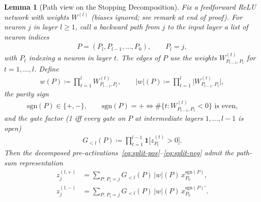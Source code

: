 \documentclass[twoside]{article}
\newcommand{\1}{\mathbf{1}}
\newtheorem{lemma}{Lemma}
\begin{document}
\begin{lemma}[Path view on the Stopping Decomposition]\label{lem:parity-path}
Fix a feedforward ReLU network with weights $W^{(l)}$ (biases ignored; see remark at end of proof).
For neuron $j$ in layer $l \ge 1$, call a \emph{backward path} from $j$ to the input layer a list
of neuron indices
\begin{align}
    P = (P_l, P_{l-1}, \dots, P_0), \qquad P_l = j,
\end{align}
with $P_t$ indexing a neuron in layer $t$. The edges of $P$ use the weights $W^{(t)}_{P_{t-1},
    P_t}$ for $t = 1, \dots, l$. Define
\begin{align}
    w(P) \coloneqq \prod_{t=1}^{l} W^{(t)}_{P_{t-1}, P_t},
    \qquad
    |w|(P) \coloneqq \prod_{t=1}^{l} \bigl| W^{(t)}_{P_{t-1}, P_t} \bigr|,
\end{align}
the parity sign
\begin{align}
    \mathrm{sgn}(P) \in \{+,-\},
    \qquad
    \mathrm{sgn}(P) = + \iff \#\bigl\{t : W^{(t)}_{P_{t-1}, P_t} < 0\bigr\} \text{ is even,}
\end{align}
and the \emph{gate factor} (1 iff every gate on $P$ at intermediate layers $1,\dots,l-1$ is open)
\begin{align}
    G_{<l}(P) \coloneqq \prod_{t=1}^{l-1} \1\!\bigl[z_{P_t}^{(t)} > 0\bigr].
\end{align}
Then the decomposed pre-activations~\eqref{eq:split-pos}--\eqref{eq:split-neg} admit the path-sum
representation
\begin{align}
    z_j^{(l,+)} &= \sum_{P:\, P_l = j} G_{<l}(P)\, |w|(P)\, x_{P_0}^{\mathrm{sgn}(P)},
    \label{eq:parity-plus}\\
    z_j^{(l,-)} &= \sum_{P:\, P_l = j} G_{<l}(P)\, |w|(P)\, x_{P_0}^{\mathrm{sgn}(P)'}.
    \label{eq:parity-minus}
\end{align}
\end{lemma}
\end{document}

